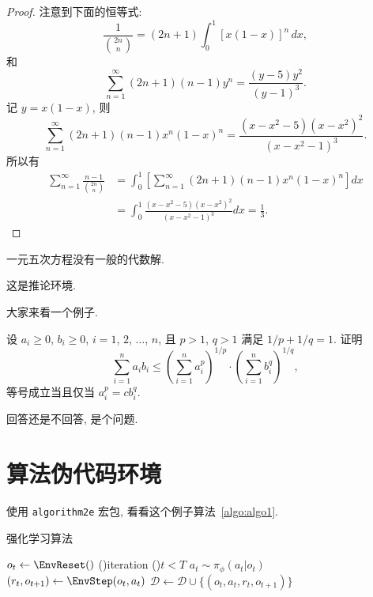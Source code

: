 \begin{proof}
注意到下面的恒等式:
\[
\frac{1}{\binom{2n}{n}}=(2n+1)\int_0^1[x(1-x)]^n\,dx,
\]
和
\[
\sum_{n=1}^{\infty}(2n+1)(n-1)y^n=\frac{(y-5)y^2}{(y-1)^3}.
\]
记 $y=x(1-x)$, 则
\[
\sum_{n=1}^{\infty}(2n+1)(n-1)x^n(1-x)^n=\frac{(x-x^2-5)(x-x^2)^2}{(x-x^2-1)^3}.
\]
所以有
\begin{align*}
\sum_{n=1}^{\infty}\frac{n-1}{\binom{2n}{n}} & =
\int_0^1\left[\sum_{n=1}^{\infty}(2n+1)(n-1)x^n(1-x)^n\right]dx\\
& =\int_0^1\frac{(x-x^2-5)(x-x^2)^2}{(x-x^2-1)^3}dx=\frac13.
\end{align*}
\end{proof}

\begin{theorem}\label{the:theorem1}
一元五次方程没有一般的代数解.
\end{theorem}

\begin{corollary}
这是推论环境.
\end{corollary}

\begin{example}
大家来看一个例子.
\end{example}

\begin{exercise}
设 $a_i\geq0$, $b_i\geq0$, $i=1$, $2$, $\ldots$, $n$, 
且 $p>1$, $q>1$ 满足 $1/p+1/q=1$. 证明
\[
\sum_{i=1}^{n}a_ib_i\leq\left(\sum_{i=1}^{n}a_i^p\right)^{1/p}
\cdot\left(\sum_{i=1}^{n}b_i^q\right)^{1/q},
\]
等号成立当且仅当 $a_i^p=cb_i^q$.
\end{exercise}

\begin{problem}
回答还是不回答, 是个问题. 
\end{problem}

\newpage
\section{算法伪代码环境}

使用 \texttt{algorithm2e} 宏包, 看看这个例子算法~\ref{algo:algo1}.

\begin{algorithm}[!htbp]
  \caption{强化学习算法}
  \label{algo:algo1}
  \DontPrintSemicolon
  \vspace{5pt}

  \Output{$\phi$}
  \BlankLine

  $o_t \leftarrow \EnvReset()$\;
  \Forever(){iteration}{
    \While(){$t<T$}{
      $a_t\sim \pi_\phi(a_t|o_t)$ 
      $(r_t,o_{t+1}) \leftarrow \EnvStep(o_t,a_t)$ 
      $\mathcal{D} \leftarrow \mathcal{D} \cup \{(o_t,a_t,r_t,o_{t+1})\}$ 
    }
  }
\end{algorithm}
